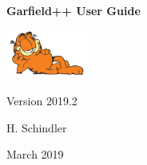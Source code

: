 \begin{titlepage}
  {
  \centering
  \sffamily
  \linespread{1.5}

  \vspace{3cm} 

  \huge{\textbf{Garfield++ User Guide}}

  \vspace{2cm}

  \includegraphics[width=0.2\textwidth]{garfield.jpg}

  \vspace{2cm}

  \large
  Version 2019.2 

  \vspace{2cm}
  \large
  H. Schindler

  \vfill

  March 2019

  }
\end{titlepage}
